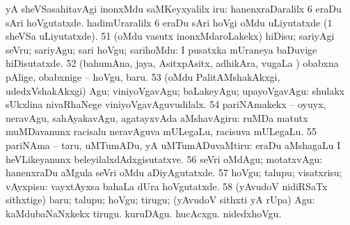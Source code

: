 {{yA sheVSasahitavAgi inonxMdu saMKeyxyalilx iru:  hanenxraDaralilx $6$ eraDu sAri hoVgutatxde.  hadimUraralilx $6$ eraDu sAri hoVgi oMdu
uLiyutatxde ($1$ sheVSa uLiyutatxde). 
\num{51} (oMdu vasutx inonxMdaroLakekx) hiDisu; sariyAgi seVru; sariyAgu; sari hoVgu;
sarihoMdu:  I pusatxka mUraneya baDuvige
hiDisutatxde. 
\num{52} (bahumAna, jaya, AsitxpAsitx, adhikAra, \mo vugaLa \vi)
obabxna pAlige, obabxnige -- hoVgu, baru. 
\num{53} (oMdu PalitAMshakAkxgi, udedxVshakAkxgi) Agu; viniyoVgavAgu; baLakeyAgu; upayoVgavAgu:  shulakx sUkxlina nivaRhaNege viniyoVgavAguvudilalx.
\num{54} pariNAmakekx -- oyuyx, neravAgu, sahAyakavAgu, agatayxvAda aMshavAgiru:
 ruMDa matutx muMDavanunx racisalu neravAguva mULegaLu, racisuva mULegaLu. 
\num{55} pariNAma -- taru,
uMTumADu, yA uMTumADuvaMtiru:  eraDu aMshagaLu I heVLikeyanunx beleyilalxdAdxgisutatxve.
\num{56} seVri oMdAgu; motatxvAgu:  hanenxraDu aMgula seVri oMdu aDiyAgutatxde. 
\num{57} hoVgu; talupu; visatxrisu; vAyxpisu:
 vayxtAyxsa bahaLa dUra hoVgutatxde. 
\num{58} (yAvudoV nidiRSaTx sithxtige) baru; talupu; hoVgu; tirugu; (yAvudoV sithxti
yA rUpa) Agu:  kaMdubaNaNxkekx tirugu.  kuruDAgu.
 hucAcxgu.  nidedxhoVgu.{}}}

\noindent
\gl{\sakirx}
{}

